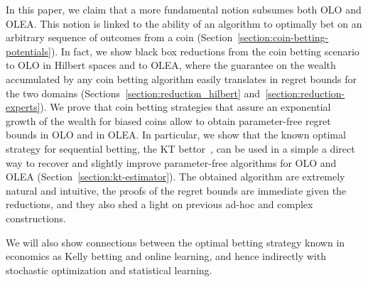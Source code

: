 In this paper, we claim that a more fundamental notion subsumes both \ac{OLO}
and \ac{OLEA}. This notion is linked to the ability of an algorithm to
optimally bet on an arbitrary sequence of outcomes from a coin (Section~\ref{section:coin-betting-potentials}). In fact, we show black
box reductions from the coin betting scenario to \ac{OLO} in Hilbert spaces and
to \ac{OLEA}, where the guarantee on the wealth accumulated by any coin betting
algorithm easily translates in regret bounds for the two domains (Sections~\ref{section:reduction_hilbert} and~\ref{section:reduction-experts}). We prove that
coin betting strategies that assure an exponential growth of the wealth for
biased coins allow to obtain parameter-free regret bounds in \ac{OLO} and in
\ac{OLEA}. In particular, we show that the known optimal strategy for
sequential betting, the \ac{KT} bettor~\citep{KrichevskyT81}, can be used in a
simple a direct way to recover and slightly improve parameter-free algorithms
for \ac{OLO} and \ac{OLEA} (Section~\ref{section:kt-estimator}). The obtained algorithm are extremely natural and
intuitive, the proofs of the regret bounds are immediate given the reductions,
and they also shed a light on previous ad-hoc and complex constructions.

We will also show connections between the optimal betting strategy known in
economics as Kelly betting \citep{Kelly56} and online learning, and hence
indirectly with stochastic optimization and statistical learning.
